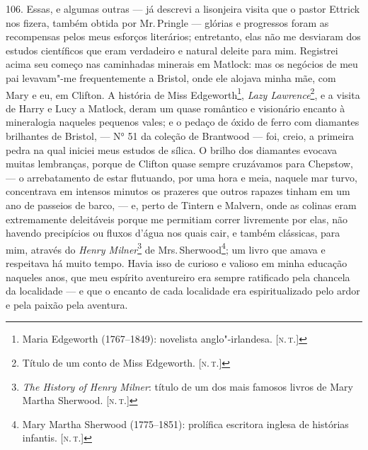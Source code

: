 106. Essas, e algumas outras --- já descrevi a lisonjeira visita que o
pastor Ettrick nos fizera, também obtida por Mr.\,Pringle --- glórias e
progressos foram as recompensas pelos meus esforços literários;
entretanto, elas não me desviaram dos estudos científicos que eram
verdadeiro e natural deleite para mim. Registrei acima seu começo nas
caminhadas minerais em Matlock: mas os negócios de meu pai levavam"-me
frequentemente a Bristol, onde ele alojava minha mãe, com Mary e eu, em
Clifton. A história de Miss Edgeworth\footnote{Maria Edgeworth
  (1767--1849): novelista anglo"-irlandesa. {[}\textsc{n.\,t.}{]}}, \emph{Lazy
Lawrence}\footnote{Título de um conto de Miss Edgeworth. {[}\textsc{n.\,t.}{]}},
e a visita de Harry e Lucy a Matlock, deram um quase romântico e
visionário encanto à mineralogia naqueles pequenos vales; e o pedaço de
óxido de ferro com diamantes brilhantes de Bristol, --- N° 51 da coleção
de Brantwood --- foi, creio, a primeira pedra na qual iniciei meus
estudos de sílica. O brilho dos diamantes evocava muitas lembranças,
porque de Clifton quase sempre cruzávamos para Chepstow, --- o
arrebatamento de estar flutuando, por uma hora e meia, naquele mar
turvo, concentrava em intensos minutos os prazeres que outros rapazes
tinham em um ano de passeios de barco, --- e, perto de Tintern e Malvern,
onde as colinas eram extremamente deleitáveis porque me permitiam correr
livremente por elas, não havendo precipícios ou fluxos d'água nos quais
cair, e também clássicas, para mim, através do \emph{Henry
Milner}\footnote{\emph{The History of Henry Milner}: título de um dos
  mais famosos livros de Mary Martha Sherwood. {[}\textsc{n.\,t.}{]}} de Mrs.\,Sherwood\footnote{Mary Martha Sherwood (1775--1851): prolífica escritora
  inglesa de histórias infantis. {[}\textsc{n.\,t.}{]}}; um livro que amava e
respeitava há muito tempo. Havia isso de curioso e valioso em minha
educação naqueles anos, que meu espírito aventureiro era sempre
ratificado pela chancela da localidade --- e que o encanto de cada
localidade era espiritualizado pelo ardor e pela paixão pela aventura.

